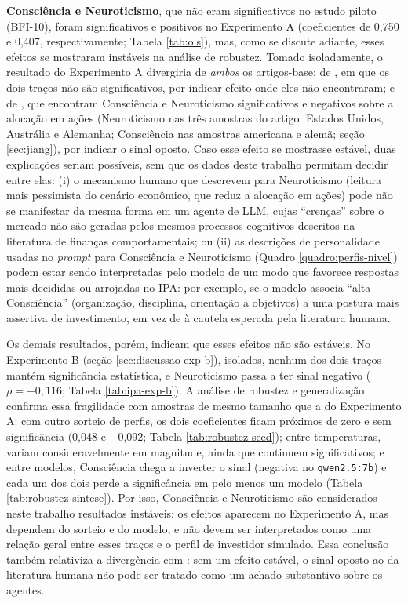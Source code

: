 \textbf{Consciência e Neuroticismo}, que não eram significativos no
estudo piloto (BFI-10), foram significativos e positivos no Experimento
A (coeficientes de 0,750 e 0,407, respectivamente; Tabela \ref{tab:ols}),
mas, como se discute adiante, esses efeitos se mostraram instáveis na
análise de robustez. Tomado isoladamente, o resultado do Experimento A
divergiria de \emph{ambos} os artigos-base: de ,
em que os dois traços não são significativos, por indicar efeito onde
eles não encontraram; e de , que encontram
Consciência e Neuroticismo significativos e negativos sobre a
alocação em ações (Neuroticismo nas três amostras do artigo: Estados
Unidos, Austrália e Alemanha; Consciência nas amostras americana e
alemã; seção \ref{sec:jiang}), por indicar o sinal
oposto. Caso esse efeito se mostrasse estável, duas explicações seriam
possíveis, sem que os dados deste trabalho permitam decidir entre elas:
(i) o mecanismo humano que  descrevem para
Neuroticismo (leitura mais pessimista do cenário econômico, que reduz a
alocação em ações) pode não se manifestar da mesma forma em um agente de
LLM, cujas ``crenças'' sobre o mercado não são geradas pelos mesmos
processos cognitivos descritos na literatura de finanças
comportamentais; ou (ii) as descrições de personalidade usadas no
\textit{prompt} para Consciência e Neuroticismo (Quadro
\ref{quadro:perfis-nivel}) podem estar sendo interpretadas pelo modelo de
um modo que favorece respostas mais decididas ou arrojadas no IPA: por
exemplo, se o modelo associa ``alta Consciência'' (organização,
disciplina, orientação a objetivos) a uma postura mais assertiva de
investimento, em vez de à cautela esperada pela literatura humana.

Os demais resultados, porém, indicam que esses efeitos não são
estáveis. No Experimento B (seção \ref{sec:discussao-exp-b}), isolados,
nenhum dos dois traços mantém significância estatística, e Neuroticismo
passa a ter sinal negativo ($\rho=-0{,}116$; Tabela
\ref{tab:ipa-exp-b}). A análise de robustez e generalização confirma essa
fragilidade com amostras de mesmo tamanho que a do Experimento A: com
outro sorteio de perfis, os dois coeficientes ficam próximos de zero e
sem significância (0,048 e $-$0,092; Tabela \ref{tab:robustez-seed});
entre temperaturas, variam consideravelmente em magnitude, ainda que
continuem significativos; e entre modelos, Consciência chega a inverter
o sinal (negativa no \texttt{qwen2.5:7b}) e cada um dos dois perde a
significância em pelo menos um modelo (Tabela \ref{tab:robustez-sintese}).
Por isso, Consciência e Neuroticismo são considerados neste trabalho
resultados instáveis: os efeitos aparecem no Experimento A, mas
dependem do sorteio e do modelo, e não devem ser interpretados como uma
relação geral entre esses traços e o perfil de investidor simulado. Essa
conclusão também relativiza a divergência com
: sem um efeito estável, o sinal oposto ao
da literatura humana não pode ser tratado como um achado substantivo
sobre os agentes.

